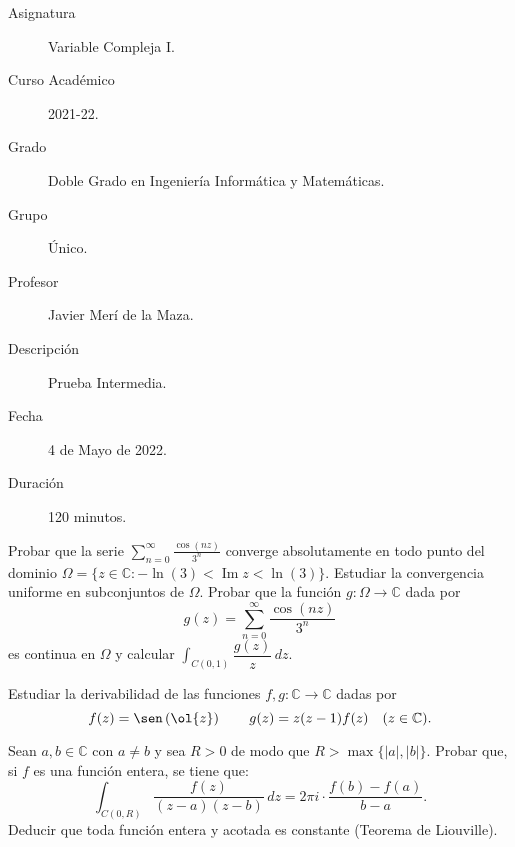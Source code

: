 \documentclass[12pt]{article}
\renewcommand{\Im}{\operatorname{Im}}
\begin{document}

    
    

    \begin{description}
        \item[Asignatura] Variable Compleja I.
        \item[Curso Académico] 2021-22.
        \item[Grado] Doble Grado en Ingeniería Informática y Matemáticas.
        \item[Grupo] Único.
        \item[Profesor] Javier Merí de la Maza.
        \item[Descripción] Prueba Intermedia.
        \item[Fecha] 4 de Mayo de 2022.
        \item[Duración] 120 minutos.
    
    \end{description}
    \newpage

    \begin{ejercicio}[4 puntos]
        Probar que la serie $\displaystyle \sum_{n=0}^{\infty} \frac{\cos(nz)}{3^n}$ converge absolutamente en todo punto del dominio $\Omega = \{ z \in \mathbb{C} : -\ln(3) < \Im z < \ln(3) \}$. Estudiar la convergencia uniforme en subconjuntos de $\Omega$. Probar que la función $g : \Omega \to \mathbb{C}$ dada por
        \[
            g(z) = \sum_{n=0}^{\infty} \frac{\cos(nz)}{3^n}
        \]
        es continua en $\Omega$ y calcular $\displaystyle \int_{C(0,1)} \dfrac{g(z)}{z} \, dz$.
    \end{ejercicio}

    \begin{ejercicio}[3 puntos]
        Estudiar la derivabilidad de las funciones $f, g : \mathbb{C} \to \mathbb{C}$ dadas por
        \[
            f(z) = \sen\left(\ol{z}\right)\qquad g(z) = z(z-1)f(z) \quad (z \in \mathbb{C}).
        \]
    \end{ejercicio}

    \begin{ejercicio}[3 puntos]
        Sean $a, b \in \mathbb{C}$ con $a \neq b$ y sea $R > 0$ de modo que $R > \max\{ |a|, |b| \}$. Probar que, si $f$ es una función entera, se tiene que:
        \[
            \int_{C(0,R)} \frac{f(z)}{(z-a)(z-b)} \, dz = 2\pi i \cdot \frac{f(b) - f(a)}{b-a}.
        \]
        Deducir que toda función entera y acotada es constante (Teorema de Liouville).
    \end{ejercicio}
\end{document}
